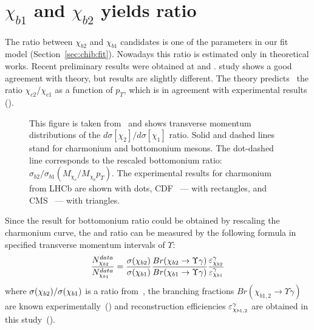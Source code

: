 \section{\texorpdfstring{$\chi_{b1}$}{chib1} and \texorpdfstring{$\chi_{b2}$}{chib2} yields ratio}
\label{sec:ratio}

The ratio between $\chi_{b2}$ and $\chi_{b1}$ candidates is one of the
parameters in our fit model (Section~\ref{sec:chib:fit}). Nowadays this ratio
is estimated only in theoretical works. Recent \lhcb preliminary results were
obtained at \lhcb and \cms. \lhcb study  shows a good agreement with theory,
but \cms\cite{CMS-PAS-BPH-13-005} results are slightly different. The theory
predicts~\cite{Likhoded:2012hw} the ratio $\chi_{c2}/\chi_{c1}$ as a function
of $p_T$, which is in agreement with experimental results ().

\begin{figure}[H]
  \setlength{\unitlength}{1mm}
  \centering
  \caption {\small This figure is taken from~\cite{Likhoded:2012hw} and shows
  transverse momentum distributions of the
$d\sigma\left[\chi_{2}\right]/d\sigma[\chi_{1}]$ ratio. Solid and dashed lines
stand for charmonium and bottomonium mesons. The dot-dashed line corresponds to
the rescaled bottomonium ratio:
$\sigma_{b2}/\sigma_{b1}(M_{\chi_c}/M_{\chi_b}p_T)$. The experimental results
for charmonium from LHCb\cite{LHCb-PAPER-2013-028} are shown with dots,
CDF~\cite{Abulencia:2007bra} --- with rectangles, and CMS~\cite{Chatrchyan:2012ub}
--- with triangles.}
  \label{fig:frac:ratio}
\end{figure}

Since the result for bottomonium ratio could be obtained by rescaling the
charmonium curve, the  \chibone and \chibtwo ratio can be  measured by the
following formula in specified transverse momentum intervals of $\Upsilon$:
\begin{equation}
    \frac{N_{\chibtwo}^{data}}{N_{\chibone}^{data}} = \frac{\sigma(\chibtwo)}{\sigma(\chibone)}
    \frac{Br(\chibtwo\to\Upsilon\gamma)}{Br(\chibone\to\Upsilon\gamma)}\frac{\eps_{\chibtwo}^{\gamma}}{\eps_{\chibone}^{\gamma}}
\label{eqn:mc_ratio}
\end{equation}
\noindent where $\sigma(\chi_{b 2}) / \sigma(\chi_{b 1})$ is a ratio
from~\cite{Likhoded:2012hw}, the branching fractions $Br(\chi_{b1,2} \to \Upsilon \gamma)$ 
are known experimentally~() and reconstruction efficiencies 
$\varepsilon_{\chi_{b1,2}}^{\gamma}$ are obtained in this study~().

